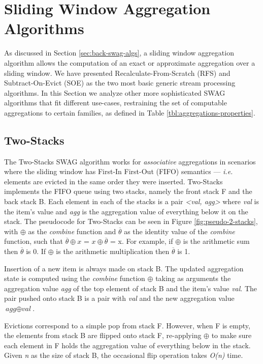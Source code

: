 \section{Sliding Window Aggregation Algorithms} \label{sec:sota-swag-algs}

As discussed in Section \ref{sec:back-swag-algs}, a sliding window aggregation algorithm allows the computation of an exact or approximate aggregation over a sliding window. We have presented Recalculate-From-Scratch (RFS) and Subtract-On-Evict (SOE) as the two most basic generic stream processing algorithms. In this Section we analyze other more sophisticated SWAG algorithms that fit different use-cases, restraining the set of computable aggregations to certain families, as defined in Table \ref{tbl:aggregations-properties}.

\subsection{Two-Stacks}
The Two-Stacks SWAG algorithm works for \textit{associative} aggregations in scenarios where the sliding window has First-In First-Out (FIFO) semantics --- \textit{i.e.} elements are evicted in the same order they were inserted. Two-Stacks \cite{Tangwongsan-DABA} implements the FIFO queue using two stacks, namely the front stack F and the back stack B. Each element in each of the stacks is a pair \textit{<val, agg>} where \textit{val} is the item's value and \textit{agg} is the aggregation value of everything below it on the stack. The pseudocode for Two-Stacks can be seen in Figure \ref{fig:pseudo-2-stacks}, with $\oplus$ as the \textit{combine} function and $\overline{\theta}$ as the identity value of the \textit{combine} function, such that $\overline{\theta} \oplus x$ = $x \oplus \overline{\theta}$ = x. For example, if $\oplus$ is the arithmetic sum then $\overline{\theta}$ is 0. If $\oplus$ is the arithmetic multiplication then $\overline{\theta}$ is 1.

Insertion of a new item is always made on stack B. The updated aggregation state is computed using the \textit{combine} function $\oplus$ taking as arguments the aggregation value \textit{agg} of the top element of stack B and the item's value \textit{val}. The pair pushed onto stack B is a pair with \textit{val} and the new aggregation value $\textit{agg} \oplus \textit{val}$.

Evictions correspond to a simple pop from stack F. However, when F is empty, the elements from stack B are flipped onto stack F, re-applying $\oplus$ to make sure each element in F holds the aggregation value of everything below in the stack. Given \textit{n} as the size of stack B, the occasional flip operation takes \textit{O(n)} time.

